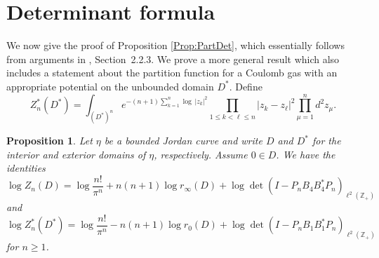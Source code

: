 \documentclass{article}
\numberwithin{equation}{section}
\numberwithin{figure}{section}
\theoremstyle{plain}
\theoremstyle{plain}
\numberwithin{thm}{section}
\newtheorem{proposition}[thm]{Proposition}
\theoremstyle{remark}
\newcommand{\Z}{\mathbb{Z}}
\let \le \leqslant
\let \ge \geqslant
\begin{document}
\section{Determinant formula}\label{Subsec:PartDet}
We now give the proof of Proposition \ref{Prop:PartDet}, which essentially follows from arguments in \cite{TT}, Section~2.2.3. We prove a more general result which also includes a statement about the partition function for a Coulomb gas with an appropriate potential on the unbounded domain $D^*$. Define  \[
 Z_n^*(D^*) = \int_{(D^*)^n} e^{-(n+1) \sum_{k=1}^n\log \, |z_k|^2}\prod_{1\le k < \ell  \le n}|z_k-z_\ell|^2 \prod_{\mu =1}^n d^2 z_\mu.
  \]
\begin{proposition}\label{prop:partdet2}
    Let $\eta$ be a bounded Jordan curve and write $D$ and $D^*$ for the interior and exterior domains of $\eta$, respectively. Assume $0 \in D$. We have the identities 
\begin{equation}\label{eq:free-energy1}
\log Z_n(D)=\log \frac{n!}{\pi^n} + n(n+1) \log  r_\infty(D)  + \log \det(I-P_nB_4B_4^*P_n)_{\ell^2(\Z_+)}
\end{equation}
and
\begin{equation}\label{eq:free-energy2}
\log Z_n^*(D^*)=\log \frac{n!}{\pi^n} - n(n+1) \log  r_0(D)  + \log \det(I-P_nB_1B_1^*P_n)_{\ell^2(\Z_+)}
\end{equation}
for $n\ge 1$.
\end{proposition}
\end{document}

